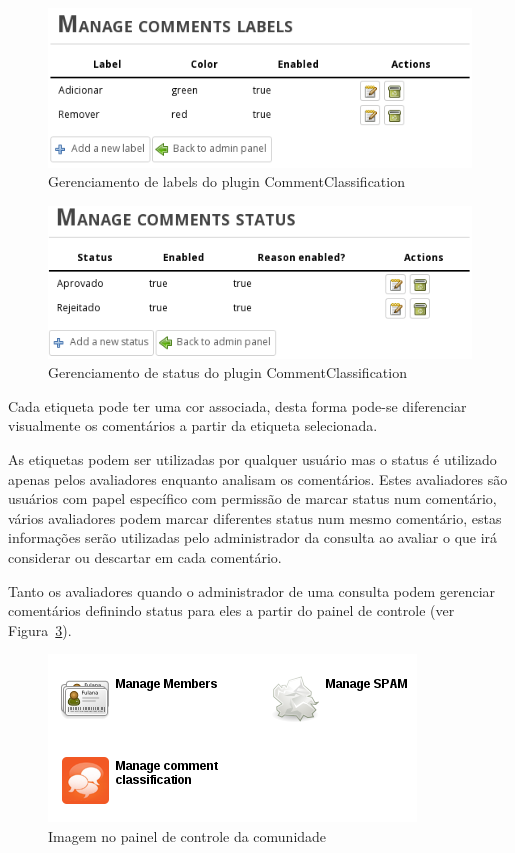 \documentclass[12pt]{article}
\begin{document}
\begin{figure}[h]
\center
\includegraphics[scale=0.5]{manage-labels.png}
\caption{Gerenciamento de labels do plugin CommentClassification}
\label{manage-labels}
\end{figure}

\begin{figure}[h]
\center
\includegraphics[scale=0.5]{manage-status.png}
\caption{Gerenciamento de status do plugin CommentClassification}
\label{manage-status}
\end{figure}

Cada etiqueta pode ter uma cor associada, desta forma pode-se diferenciar
visualmente os comentários a partir da etiqueta selecionada.

As etiquetas podem ser utilizadas por qualquer usuário mas o status é
utilizado apenas pelos avaliadores enquanto analisam os comentários. Estes
avaliadores são usuários com papel específico com permissão de marcar status
num comentário, vários avaliadores podem marcar diferentes status num
mesmo comentário, estas informações serão utilizadas pelo administrador da consulta
ao avaliar o que irá considerar ou descartar em cada comentário.

Tanto os avaliadores quando o administrador de uma consulta podem gerenciar
comentários definindo status para eles a partir do painel de controle (ver
Figura~\ref{control-panel}).

\begin{figure}[h]
\center
\includegraphics[scale=0.5]{control-panel.png}
\caption{Imagem no painel de controle da comunidade}
\label{control-panel}
\end{figure}
\end{document}
